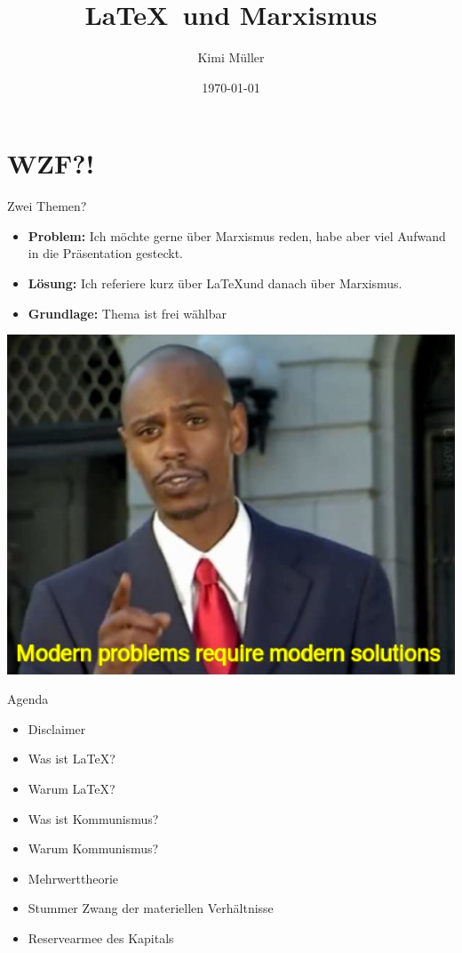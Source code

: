 \documentclass{beamer}
\title{\LaTeX \  und Marxismus}
\date{\today}
\author{Kimi Müller}
\begin{document}
  \maketitle
  \section{WZF?!}
  \begin{frame}{Zwei Themen?}
    \begin{itemize}
        \item<1-> \textbf{Problem:} Ich möchte gerne über Marxismus reden, habe aber viel Aufwand in die Präsentation gesteckt.
        \item<2-> \textbf{Lösung:} Ich referiere kurz über \LaTeX und danach über Marxismus.
        \item<3-> \textbf{Grundlage:} Thema ist frei wählbar
    \end{itemize}
  \end{frame}
  \begin{frame}
    \includegraphics[width=\textwidth]{Modern_Problems_Require_Modern_Solutions.jpg}
  \end{frame}
  \begin{frame}{Agenda}
\begin{itemize}
    \item<2-> Disclaimer
    \item<3-> Was ist \LaTeX?
    \item<4-> Warum \LaTeX?
    \item<5-> Was ist Kommunismus?
    \item<6-> Warum Kommunismus?
    \item<7-> Mehrwerttheorie
    \item<8-> Stummer Zwang der materiellen Verhältnisse
    \item<9-> Reservearmee des Kapitals
\end{itemize}
  \end{frame}
\end{document}
